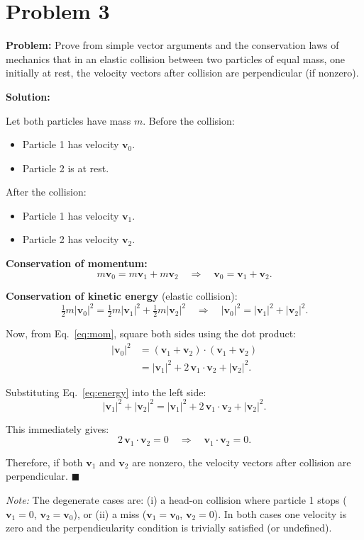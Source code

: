 \documentclass[12pt]{article}
\newcommand{\vect}[1]{\mathbf{#1}}
\begin{document}
\section*{Problem 3}

\textbf{Problem:} Prove from simple vector arguments and the conservation laws of mechanics that in an elastic collision between two particles of equal mass, one initially at rest, the velocity vectors after collision are perpendicular (if nonzero).

\bigskip
\textbf{Solution:}

Let both particles have mass $m$. Before the collision:
\begin{itemize}
\item Particle 1 has velocity $\vect{v}_0$.
\item Particle 2 is at rest.
\end{itemize}

After the collision:
\begin{itemize}
\item Particle 1 has velocity $\vect{v}_1$.
\item Particle 2 has velocity $\vect{v}_2$.
\end{itemize}

\textbf{Conservation of momentum:}
\begin{equation}
m\vect{v}_0 = m\vect{v}_1 + m\vect{v}_2 \quad \Longrightarrow \quad \vect{v}_0 = \vect{v}_1 + \vect{v}_2. \label{eq:mom}
\end{equation}

\textbf{Conservation of kinetic energy} (elastic collision):
\begin{equation}
\tfrac{1}{2}m|\vect{v}_0|^2 = \tfrac{1}{2}m|\vect{v}_1|^2 + \tfrac{1}{2}m|\vect{v}_2|^2 \quad \Longrightarrow \quad |\vect{v}_0|^2 = |\vect{v}_1|^2 + |\vect{v}_2|^2. \label{eq:energy}
\end{equation}

Now, from Eq.~\eqref{eq:mom}, square both sides using the dot product:
\begin{align}
|\vect{v}_0|^2 &= (\vect{v}_1 + \vect{v}_2) \cdot (\vect{v}_1 + \vect{v}_2) \\
&= |\vect{v}_1|^2 + 2\,\vect{v}_1 \cdot \vect{v}_2 + |\vect{v}_2|^2. \label{eq:squared}
\end{align}

Substituting Eq.~\eqref{eq:energy} into the left side:
\[
|\vect{v}_1|^2 + |\vect{v}_2|^2 = |\vect{v}_1|^2 + 2\,\vect{v}_1 \cdot \vect{v}_2 + |\vect{v}_2|^2.
\]

This immediately gives:
\[
2\,\vect{v}_1 \cdot \vect{v}_2 = 0 \quad \Longrightarrow \quad \boxed{\vect{v}_1 \cdot \vect{v}_2 = 0}.
\]

Therefore, if both $\vect{v}_1$ and $\vect{v}_2$ are nonzero, the velocity vectors after collision are perpendicular. \hfill $\blacksquare$

\textit{Note:} The degenerate cases are: (i) a head-on collision where particle 1 stops ($\vect{v}_1 = 0$, $\vect{v}_2 = \vect{v}_0$), or (ii) a miss ($\vect{v}_1 = \vect{v}_0$, $\vect{v}_2 = 0$). In both cases one velocity is zero and the perpendicularity condition is trivially satisfied (or undefined).
\end{document}
